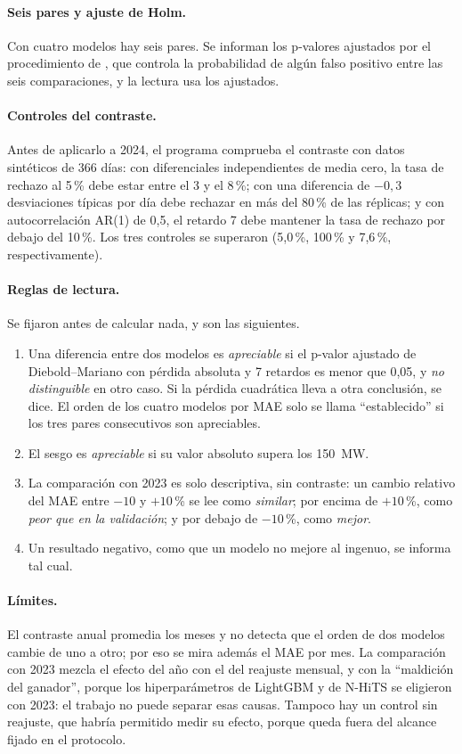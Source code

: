 \paragraph{Seis pares y ajuste de Holm.} Con cuatro modelos hay seis pares. Se
informan los p-valores ajustados por el procedimiento de \textcite{holm1979simple},
que controla la probabilidad de algún falso positivo entre las seis
comparaciones, y la lectura usa los ajustados.

\paragraph{Controles del contraste.} Antes de aplicarlo a 2024, el programa
comprueba el contraste con datos sintéticos de 366 días: con diferenciales
independientes de media cero, la tasa de rechazo al 5\,\% debe estar entre el 3
y el 8\,\%; con una diferencia de $-0{,}3$ desviaciones típicas por día debe
rechazar en más del 80\,\% de las réplicas; y con autocorrelación AR(1) de 0,5,
el retardo 7 debe mantener la tasa de rechazo por debajo del 10\,\%. Los tres
controles se superaron (5,0\,\%, 100\,\% y 7,6\,\%, respectivamente).

\paragraph{Reglas de lectura.} Se fijaron antes de calcular nada, y son las
siguientes.
\begin{enumerate}
	\item Una diferencia entre dos modelos es \emph{apreciable} si el p-valor
	ajustado de Diebold--Mariano con pérdida absoluta y 7 retardos es menor que
	0,05, y \emph{no distinguible} en otro caso. Si la pérdida cuadrática lleva
	a otra conclusión, se dice. El orden de los cuatro modelos por MAE solo se
	llama \enquote{establecido} si los tres pares consecutivos son apreciables.
	\item El sesgo es \emph{apreciable} si su valor absoluto supera los
	150~MW.
	\item La comparación con 2023 es solo descriptiva, sin contraste: un cambio
	relativo del MAE entre $-10$ y $+10$\,\% se lee como \emph{similar}; por
	encima de $+10$\,\%, como \emph{peor que en la validación}; y por debajo de
	$-10$\,\%, como \emph{mejor}.
	\item Un resultado negativo, como que un modelo no mejore al ingenuo, se
	informa tal cual.
\end{enumerate}

\paragraph{Límites.} El contraste anual promedia los meses y no detecta que el
orden de dos modelos cambie de uno a otro; por eso se mira además el MAE por
mes. La comparación con 2023 mezcla el efecto del año con el del reajuste
mensual, y con la \enquote{maldición del ganador}, porque los hiperparámetros de
LightGBM y de N-HiTS se eligieron con 2023: el trabajo no puede separar esas
causas. Tampoco hay un control sin reajuste, que habría permitido medir su
efecto, porque queda fuera del alcance fijado en el protocolo.

